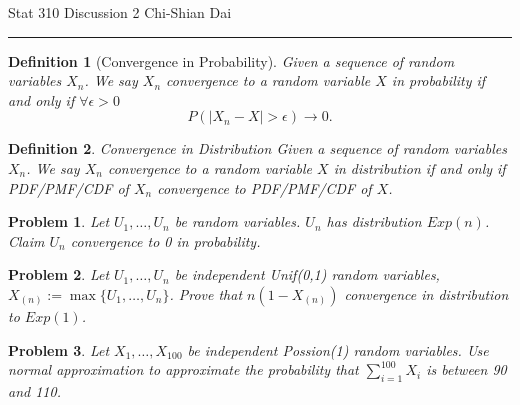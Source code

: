 \documentclass[12pt]{article}
\newtheorem{problem}{Problem}
\newtheorem{definition}{Definition}
\begin{document}
	\noindent Stat 310 \hfill  Discussion 2 \hfill Chi-Shian Dai
\smallskip
	\hrule
	\begin{definition}[Convergence in Probability]
		Given a sequence of random variables $X_n$. We say $X_n$ convergence to a random variable $X$ in probability if and only if $\forall \epsilon>0$
		$$P(|X_n-X|>\epsilon)\rightarrow 0.$$
	\end{definition}\par
\vspace*{2\baselineskip}
	\begin{definition}{Convergence in Distribution}
		Given a sequence of random variables $X_n$. We say $X_n$ convergence to a random variable $X$ in distribution if and only if PDF/PMF/CDF of $X_n$ convergence to  PDF/PMF/CDF of $X$.
	\end{definition}
\vspace*{2\baselineskip}
	\begin{problem}
	Let $U_1,\dots,U_n$ be random variables. $U_n$ has distribution  
	$Exp(n)$. Claim $U_n$ convergence to 0 in probability.
	\end{problem}
	\vspace*{2\baselineskip}
	\begin{problem}
		Let $U_1,\dots,U_n$ be independent Unif(0,1) random variables, $X_{(n)}:=\max \{U_1,\dots, U_n\}$. Prove that $n(1-X_{(n)})$ convergence in distribution to $Exp(1)$.
	\end{problem}
\vspace*{2\baselineskip}
\begin{problem}
Let $X_1,\dots,X_{100}$ be independent Possion(1) random variables. Use normal approximation to approximate the probability that $\sum_{i=1}^{100} X_i$ is between 90 and 110.
\end{problem}
\end{document}
